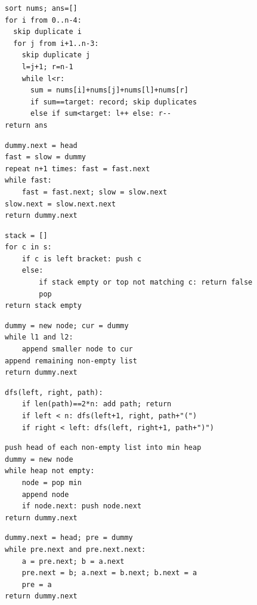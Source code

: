 \documentclass[11pt,a4paper]{ctexart}
\begin{document}
\begin{verbatim}
sort nums; ans=[]
for i from 0..n-4:
  skip duplicate i
  for j from i+1..n-3:
    skip duplicate j
    l=j+1; r=n-1
    while l<r:
      sum = nums[i]+nums[j]+nums[l]+nums[r]
      if sum==target: record; skip duplicates
      else if sum<target: l++ else: r--
return ans
\end{verbatim}

\begin{verbatim}
dummy.next = head
fast = slow = dummy
repeat n+1 times: fast = fast.next
while fast:
    fast = fast.next; slow = slow.next
slow.next = slow.next.next
return dummy.next
\end{verbatim}

\begin{verbatim}
stack = []
for c in s:
    if c is left bracket: push c
    else:
        if stack empty or top not matching c: return false
        pop
return stack empty
\end{verbatim}

\begin{verbatim}
dummy = new node; cur = dummy
while l1 and l2:
    append smaller node to cur
append remaining non-empty list
return dummy.next
\end{verbatim}

\begin{verbatim}
dfs(left, right, path):
    if len(path)==2*n: add path; return
    if left < n: dfs(left+1, right, path+"(")
    if right < left: dfs(left, right+1, path+")")
\end{verbatim}

\begin{verbatim}
push head of each non-empty list into min heap
dummy = new node
while heap not empty:
    node = pop min
    append node
    if node.next: push node.next
return dummy.next
\end{verbatim}

\begin{verbatim}
dummy.next = head; pre = dummy
while pre.next and pre.next.next:
    a = pre.next; b = a.next
    pre.next = b; a.next = b.next; b.next = a
    pre = a
return dummy.next
\end{verbatim}
\end{document}
